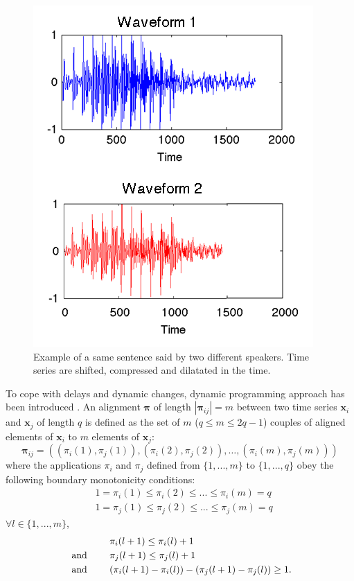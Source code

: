 \begin{figure}[h!]
\centering
\includegraphics[width=0.5\linewidth]{images/Voice_Example2}
\caption[Example of a same sentence said by two different speakers.]{Example of a same sentence said by two different speakers. Time series are shifted, compressed and dilatated in the time.}
\label{fig:Voice_Example}
\end{figure}
To cope with delays and dynamic changes, dynamic programming approach has been introduced \cite{Berndt1994a}. An alignment $\boldsymbol{\pi}$ of length $|\boldsymbol{\pi}_{ij}|=m$ between two time series $\textbf{x}_i$ and $\textbf{x}_j$ of length $q$ is defined as the set of $m$ ($q \leq m \leq 2q-1$) couples of aligned elements of $\textbf{x}_i$ to $m$ elements of $\textbf{x}_j$:
\begin{equation}
\boldsymbol{\pi}_{ij} = 
\left(  
(\pi_i(1),\pi_j(1)), 
(\pi_i(2),\pi_j(2)), 
\ldots,
(\pi_i(m),\pi_j(m))
\right) 
\end{equation}
\noindent where the applications $\pi_i$ and $\pi_j$ defined from $\{1, ..., m\}$ to $\{1, ..., q\}$ obey the following boundary monotonicity conditions: 
\begin{align}
& 1 = \pi_i(1) \leq \pi_i(2) \leq ... \leq \pi_i(m) = q \\
& 1 = \pi_j(1) \leq \pi_j(2) \leq ... \leq \pi_j(m) = q 
\end{align}
$\forall l \in \{1, ..., m\}$, 
\begin{align}
& \pi_i(l+1) \leq \pi_i(l)+1 \\
\text{  and  \qquad} & \pi_j(l+1) \leq \pi_j(l)+1 \\
\text{  and  \qquad} & ( \pi_i(l+1)-\pi_i(l) ) - ( \pi_j(l+1)-\pi_j(l)) \geq 1 . 
\end{align}


